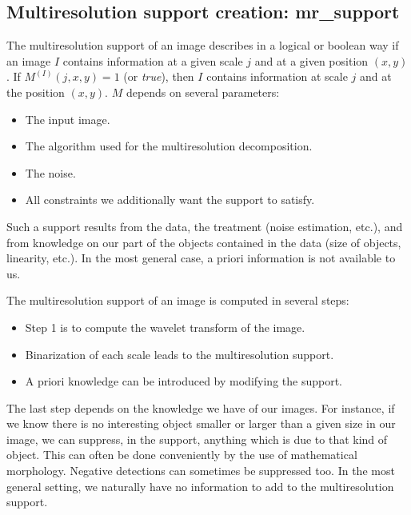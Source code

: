\subsection{Multiresolution support creation: mr\_support}
\label{sect_support}
The multiresolution support of an image describes in a
logical or boolean way if an image $I$ contains information at a 
given scale $j$ and at a given position $(x,y)$ \cite{starck:sta95_1,starck:mur95_2,starck:mur93}.
If $M^{(I)}(j,x,y) = 1$ (or {\it true}), then $I$ contains information at 
scale $j$ and at the position $(x,y)$.
$M$ depends on several parameters:
\begin{itemize}
\item The input image.
\item The algorithm used for the multiresolution decomposition.
\item The noise.
\item All constraints we additionally want the support to satisfy.
\end{itemize}
Such a support results from the data, the treatment (noise
estimation, etc.), and from knowledge on our part of the objects contained
in the data (size of objects, linearity, etc.). In the most general case, 
a priori information is not available to us.

The multiresolution support of an image is computed in several steps:
\begin{itemize}
\item Step 1 is to compute the wavelet transform of the image.
\item Binarization of each scale leads to the multiresolution support.
\item A priori knowledge can be introduced by modifying the support.
\end{itemize}
 
The last step depends on the knowledge we have of our images.
For instance, if we know there is no interesting object smaller or larger 
than a
given size in our image, we can suppress, in the support, anything which is
due to that kind of object. This can often be done conveniently by  the use of 
mathematical morphology. Negative detections can sometimes be suppressed too.
In the most general setting, we naturally have
no information to add to the multiresolution support.

